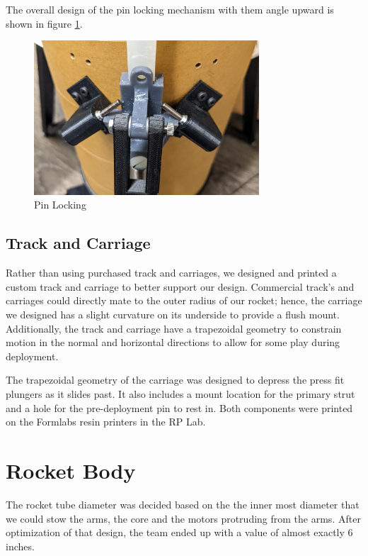 The overall design of the pin locking mechanism with them angle upward is shown in figure \ref{fig:lockpins}.

\begin{figure}[H]
    \centering
    \includegraphics[width=0.75\textwidth]{src/figs/PinLocking.jpg}
    \caption{Pin Locking}
    \label{fig:lockpins}
\end{figure}


\subsection{Track and Carriage}

Rather than using purchased track and carriages, we designed and printed a custom track and carriage to better support our design. Commercial track's and carriages could directly mate to the outer radius of our rocket; hence, the carriage we designed has a slight curvature on its underside to provide a flush mount. Additionally, the track and carriage have a trapezoidal geometry to constrain motion in the normal and horizontal directions to allow for some play during deployment. 

The trapezoidal geometry of the carriage was designed to depress the press fit plungers as it slides past. It also includes a mount location for the primary strut and a hole for the pre-deployment pin to rest in. Both components were printed on the Formlabs resin printers in the RP Lab.

\section{Rocket Body}

The rocket tube diameter was decided based on the the inner most diameter that we could stow the arms, the core and the motors protruding from the arms. After optimization of that design, the team ended up with a value of almost exactly 6 inches.

